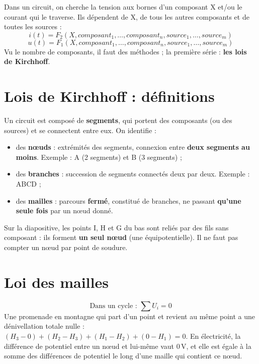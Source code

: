Dans un circuit, on cherche la tension aux bornes d'un composant X et/ou le courant qui le
traverse. Ils dépendent de X, de tous les autres composants et de toutes les sources :
\[ i(t) = F_2(X, composant_1, \ldots, composant_n, source_1, \ldots, source_m) \]
\[ u(t) = F_1(X, composant_1, \ldots, composant_n, source_1, \ldots, source_m) \]
Vu le nombre de composants, il faut des méthodes ; la première série : \textbf{les lois de
Kirchhoff}.

\section{Lois de Kirchhoff : définitions}


\begin{defnbox}[title={N\oe uds, branches, mailles}]
Un circuit est composé de \textbf{segments}, qui portent des composants (ou des sources) et
se connectent entre eux. On identifie :
\begin{itemize}
  \item des \textbf{n\oe uds} : extrémités des segments, connexion entre \textbf{deux
        segments au moins}. Exemple : A (2 segments) et B (3 segments) ;
  \item des \textbf{branches} : succession de segments connectés deux par deux. Exemple :
        ABCD ;
  \item des \textbf{mailles} : parcours \textbf{fermé}, constitué de branches, ne passant
        \textbf{qu'une seule fois} par un n\oe ud donné.
\end{itemize}
\end{defnbox}

\begin{warnbox}[title={Un fil = un seul n\oe ud}]
Sur la diapositive, les points I, H et G du bas sont reliés par des fils sans composant :
ils forment \textbf{un seul n\oe ud} (une équipotentielle). Il ne faut pas compter un n\oe ud
par point de soudure.
\end{warnbox}

\section{Loi des mailles}


\begin{thmbox}[title=Loi des mailles]
\[ \text{Dans un cycle : } \sum U_i = 0 \]
Une \og promenade\fg{} en montagne qui part d'un point et revient au même point a une
dénivellation totale nulle : $(H_3-0) + (H_2-H_3) + (H_1-H_2) + (0-H_1) = 0$. En électricité,
la différence de potentiel entre un n\oe ud et lui-même vaut 0\,V, et elle est égale à la
somme des différences de potentiel le long d'une maille qui contient ce n\oe ud.
\end{thmbox}

